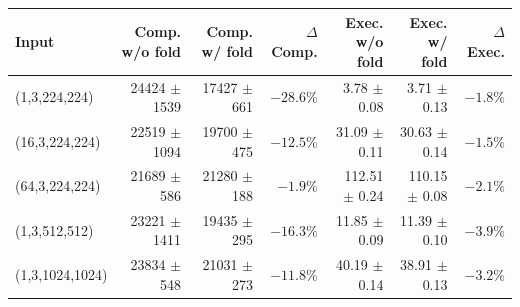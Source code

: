 \begin{tabular}{lrrrrrr}
\toprule
\textbf{Input} & \textbf{Comp. w/o fold} & \textbf{Comp. w/ fold} & \(\Delta\)\textbf{ Comp.} & \textbf{Exec. w/o fold} & \textbf{Exec. w/ fold} & \(\Delta\)\textbf{ Exec.} \\
\midrule
(1,3,224,224) & 24424 $\pm$ 1539 & 17427 $\pm$ 661 & \(-28.6\%\) & 3.78 $\pm$ 0.08 & 3.71 $\pm$ 0.13 & \(-1.8\%\) \\
(16,3,224,224) & 22519 $\pm$ 1094 & 19700 $\pm$ 475 & \(-12.5\%\) & 31.09 $\pm$ 0.11 & 30.63 $\pm$ 0.14 & \(-1.5\%\) \\
(64,3,224,224) & 21689 $\pm$ 586 & 21280 $\pm$ 188 & \(-1.9\%\) & 112.51 $\pm$ 0.24 & 110.15 $\pm$ 0.08 & \(-2.1\%\) \\
(1,3,512,512) & 23221 $\pm$ 1411 & 19435 $\pm$ 295 & \(-16.3\%\) & 11.85 $\pm$ 0.09 & 11.39 $\pm$ 0.10 & \(-3.9\%\) \\
(1,3,1024,1024) & 23834 $\pm$ 548 & 21031 $\pm$ 273 & \(-11.8\%\) & 40.19 $\pm$ 0.14 & 38.91 $\pm$ 0.13 & \(-3.2\%\) \\
\bottomrule
\end{tabular}
